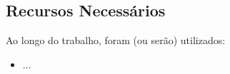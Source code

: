 \begin{table}[htb]
	\centering
	\caption{Cronograma de Atividades do segundo semestre.}
	\label{tab:cronograma-2}
\end{table}



\subsection{Recursos Necessários}
\label{sec-recursos-necessarios}

Ao longo do trabalho, foram (ou serão) utilizados:

\begin{itemize}
	\item ...
\end{itemize}

